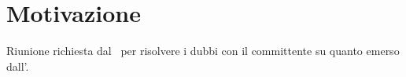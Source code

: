 \documentclass[../template.tex]{subfiles}
\begin{document}
\section{Motivazione}
Riunione richiesta dal \responsabilediprogetto\ per risolvere i dubbi con il committente su quanto emerso dall'\analisideirequisiti .
\end{document}
